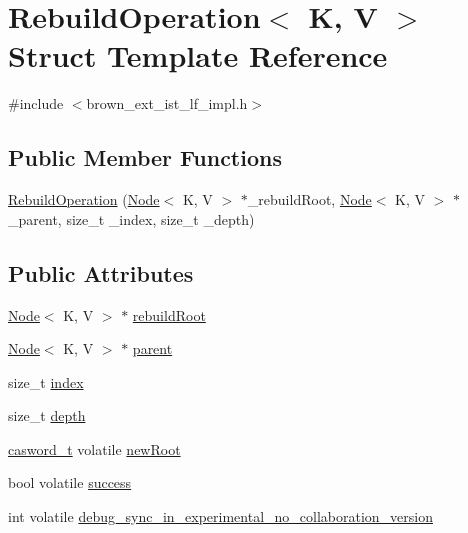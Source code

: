 \hypertarget{structRebuildOperation}{}\section{Rebuild\+Operation$<$ K, V $>$ Struct Template Reference}
\label{structRebuildOperation}


{\ttfamily \#include $<$brown\+\_\+ext\+\_\+ist\+\_\+lf\+\_\+impl.\+h$>$}

\subsection*{Public Member Functions}
\begin{DoxyCompactItemize}
\item 
\hyperlink{structRebuildOperation_a195f22f291fcdb59d26034b990b17743}{Rebuild\+Operation} (\hyperlink{classNode}{Node}$<$ K, V $>$ $\ast$\+\_\+rebuild\+Root, \hyperlink{classNode}{Node}$<$ K, V $>$ $\ast$\+\_\+parent, size\+\_\+t \+\_\+index, size\+\_\+t \+\_\+depth)
\end{DoxyCompactItemize}
\subsection*{Public Attributes}
\begin{DoxyCompactItemize}
\item 
\hyperlink{classNode}{Node}$<$ K, V $>$ $\ast$ \hyperlink{structRebuildOperation_a47844819714e7764a8109ef8985a10f5}{rebuild\+Root}
\item 
\hyperlink{classNode}{Node}$<$ K, V $>$ $\ast$ \hyperlink{structRebuildOperation_a1e175f856fceb99887d704c44ea286bd}{parent}
\item 
size\+\_\+t \hyperlink{structRebuildOperation_a5f1dcb258750901e88f71be460618292}{index}
\item 
size\+\_\+t \hyperlink{structRebuildOperation_aec85895bd9bafd0be35fda4e4c2f3e42}{depth}
\item 
\hyperlink{rq__unsafe_8h_ad45142aaf2ff20a036dc6242b8483e9c}{casword\+\_\+t} volatile \hyperlink{structRebuildOperation_a67508b4b8d5bf51ed824dd3a7e386e57}{new\+Root}
\item 
bool volatile \hyperlink{structRebuildOperation_adbf3b4e4615739a27912b0a8d84e88eb}{success}
\item 
int volatile \hyperlink{structRebuildOperation_a2e558dded3e6061be573eddaa693e404}{debug\+\_\+sync\+\_\+in\+\_\+experimental\+\_\+no\+\_\+collaboration\+\_\+version}
\end{DoxyCompactItemize}


